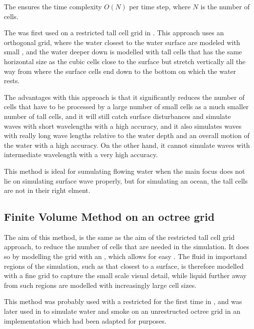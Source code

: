 The \FVM ensures the time complexity $O(N)$ per time step, where $N$ is the number of cells.

The \FVM was first used on a restricted tall cell grid in \citep{Chentanez2011}. This approach uses an orthogonal grid, where the water closest to the water surface are modeled with small , and the water deeper down is modelled with tall cells that has the same horizontal size as the cubic cells close to the surface but stretch vertically all the way from where the surface cells end down to the bottom on which the water rests.

The advantages with this approach is that it significantly reduces the number of cells that have to be processed by \approximating a large number of small cells as a much smaller number of tall cells, and it will still catch surface disturbances and simulate waves with short wavelengths with a high accuracy, and it also simulates waves with really long wave lengths relative to the water depth and an overall motion of the water with a high accuracy. On the other hand, it cannot simulate waves with intermediate wavelength with a very high accuracy.

This method is ideal for sumulating flowing water when the main focus does not lie on simulating surface wave properly, but for simulating an ocean, the tall cells are not in their right elment.

\subsection{Finite Volume Method on an octree grid}

The aim of this method, is the same as the aim of the restricted tall cell grid approach, to reduce the number of cells that are needed in the simulation. It does so by modelling the grid with an \octree, which allows for easy . The fluid in importand regions of the simulation, such as that closest to a surface, is therefore modelled with a fine grid to capture the small scale visual detail, while liquid further away from such regions are modelled with increasingly large cell sizes.

This method was probably used with a restricted  for the first time in \citep{Popinet2003}, and was later used in \citealp{Losasso2004} to simulate water and smoke on an unrestructed octree grid in an implementation which had been adapted for  purposes. 

